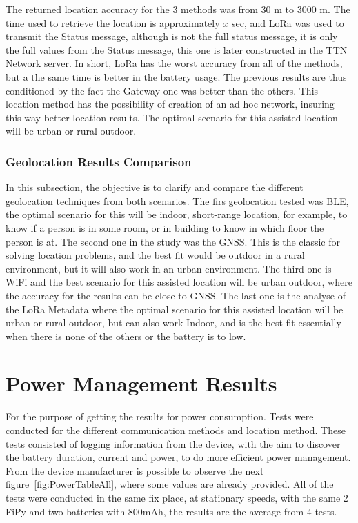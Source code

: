 The returned location accuracy for the 3 methods was from  30 m to 3000 m. The time used to retrieve the location is approximately $x$ sec, and LoRa was used to transmit the Status message, although is not the full status message, it is only the full values from the Status message, this one is later constructed in the TTN Network server.
In short, LoRa has the worst accuracy from all of the methods, but a the same time is better in the battery usage. The previous results are thus conditioned by the fact the Gateway one was better than the others. This location method has the possibility of creation of an ad hoc network, insuring this way better location results. The optimal scenario for this assisted location will be urban or rural outdoor.

\subsubsection{Geolocation Results Comparison}
\label{subsubsec:geocompare}


In this subsection, the objective is to clarify and compare the different geolocation techniques from both scenarios. The firs geolocation tested was BLE, the optimal scenario for this will be indoor, short-range location, for example, to know if a person is in some room, or in building to know in which floor the person is at. The second one in the study was the GNSS. This is the classic for solving location problems, and the best fit would be outdoor in a rural environment, but it will also work in an urban environment. The third one is WiFi and the best scenario for this assisted location will be urban outdoor, where the accuracy for the results can be close to GNSS. The last one is the analyse of the LoRa Metadata where the optimal scenario for this assisted location will be urban or rural outdoor, but can also work Indoor, and is the best fit essentially when there is none of the others or the battery is to low.




\newpage
\section{Power Management Results}
\label{subsec:power_management}

For the purpose of getting the results for power consumption.   Tests were conducted for the different communication methods and location method. These tests consisted of logging information from the device, with the aim to discover the battery duration, current and power, to do more efficient power management. From the device manufacturer is possible to observe the next figure~\ref{fig:PowerTableAll}, where some values are already provided. All of the tests were conducted in the same fix place, at stationary speeds, with the same 2 FiPy and two batteries with 800mAh, the results are the average from 4 tests.

